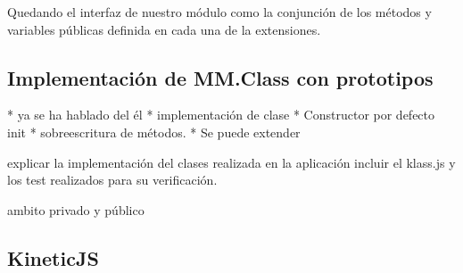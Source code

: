 Quedando el interfaz de nuestro módulo como la conjunción de los métodos y variables públicas definida en cada una de la extensiones.


\subsection{Implementación de MM.Class con prototipos}

* ya se ha hablado del él
* implementación de clase
* Constructor por defecto init 
* sobreescritura de métodos.
* Se puede extender 




explicar la implementación del clases realizada en la aplicación incluir el klass.js y los test realizados para su verificación.


ambito privado y público 


\subsection{KineticJS}
